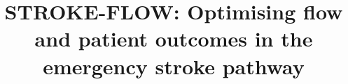 
\title{STROKE-FLOW: Optimising flow and patient outcomes in the emergency stroke pathway}

\author{} %
\date{} %